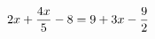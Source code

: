 \documentclass[preview]{standalone}
\begin{document}
\begin{align*}
\special{dvisvgm:raw <g id='unique000'>}2x + \frac{4x}{5} - 8 = 9 + 3x - \frac{9}{2}\special{dvisvgm:raw </g>}
\end{align*}
\end{document}
